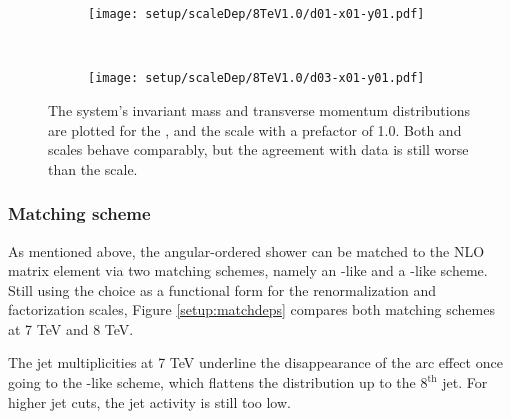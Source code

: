 \documentclass[PUB, UKenglish, texlive=2016]{\ATLASLATEXPATH atlasdoc}
\begin{document}
\begin{figure}
\centering
	\begin{subfigure}[b]{0.4\textwidth}
	\texttt{[image: setup/scaleDep/8TeV1.0/d01-x01-y01.pdf]}
	\end{subfigure} 
	~
	\begin{subfigure}[b]{0.4\textwidth}
	\texttt{[image: setup/scaleDep/8TeV1.0/d03-x01-y01.pdf]}
	\end{subfigure}
	
	\caption{The \ttbar system's invariant mass and transverse momentum distributions are plotted for the \TopPairMassScale, \TopMTScale and the \ETScale scale with a prefactor of 1.0. Both \TopMTScale and \ETScale scales behave comparably, but the agreement with data is still worse than the \HalfETScale scale.}
	\label{setup:scaledeps1factor}
\end{figure}

\subsubsection{Matching scheme}

As mentioned above, the angular-ordered shower can be matched to the NLO matrix element via two matching schemes, namely an \MCatNLO-like and a \POWHEG-like scheme. Still using the \HalfETScale choice as a functional form for the renormalization and factorization scales, Figure \ref{setup:matchdeps} compares both matching schemes at 7 TeV and 8 TeV.

The jet multiplicities at 7 TeV underline the disappearance of the \MCatNLO arc effect once going to the \POWHEG-like scheme, which flattens the distribution up to the $8^{\textrm{th}}$ jet. For higher jet \pT cuts, the jet activity is still too low.
\end{document}
